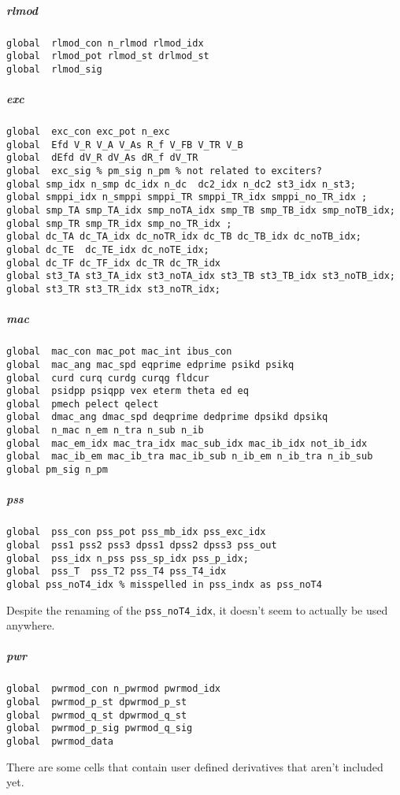 \documentclass[12pt]{article}
\begin{document}
\subparagraph{rlmod}
\begin{verbatim}
global  rlmod_con n_rlmod rlmod_idx
global  rlmod_pot rlmod_st drlmod_st
global  rlmod_sig
\end{verbatim}
\subparagraph{exc}
\begin{verbatim}
global  exc_con exc_pot n_exc
global  Efd V_R V_A V_As R_f V_FB V_TR V_B
global  dEfd dV_R dV_As dR_f dV_TR
global  exc_sig % pm_sig n_pm % not related to exciters?
global smp_idx n_smp dc_idx n_dc  dc2_idx n_dc2 st3_idx n_st3;
global smppi_idx n_smppi smppi_TR smppi_TR_idx smppi_no_TR_idx ;
global smp_TA smp_TA_idx smp_noTA_idx smp_TB smp_TB_idx smp_noTB_idx;
global smp_TR smp_TR_idx smp_no_TR_idx ;
global dc_TA dc_TA_idx dc_noTR_idx dc_TB dc_TB_idx dc_noTB_idx;
global dc_TE  dc_TE_idx dc_noTE_idx;
global dc_TF dc_TF_idx dc_TR dc_TR_idx
global st3_TA st3_TA_idx st3_noTA_idx st3_TB st3_TB_idx st3_noTB_idx;
global st3_TR st3_TR_idx st3_noTR_idx;
\end{verbatim}
\subparagraph{mac}
\begin{verbatim}
global  mac_con mac_pot mac_int ibus_con
global  mac_ang mac_spd eqprime edprime psikd psikq
global  curd curq curdg curqg fldcur
global  psidpp psiqpp vex eterm theta ed eq
global  pmech pelect qelect
global  dmac_ang dmac_spd deqprime dedprime dpsikd dpsikq
global  n_mac n_em n_tra n_sub n_ib
global  mac_em_idx mac_tra_idx mac_sub_idx mac_ib_idx not_ib_idx
global  mac_ib_em mac_ib_tra mac_ib_sub n_ib_em n_ib_tra n_ib_sub
global pm_sig n_pm 
\end{verbatim}
\subparagraph{pss}
\begin{verbatim}
global  pss_con pss_pot pss_mb_idx pss_exc_idx
global  pss1 pss2 pss3 dpss1 dpss2 dpss3 pss_out
global  pss_idx n_pss pss_sp_idx pss_p_idx;
global  pss_T  pss_T2 pss_T4 pss_T4_idx  
global pss_noT4_idx % misspelled in pss_indx as pss_noT4
\end{verbatim}
Despite the renaming of the \verb|pss_noT4_idx|, it doesn't seem to actually be used anywhere.
\subparagraph{pwr}
\begin{verbatim}
global  pwrmod_con n_pwrmod pwrmod_idx
global  pwrmod_p_st dpwrmod_p_st
global  pwrmod_q_st dpwrmod_q_st
global  pwrmod_p_sig pwrmod_q_sig
global  pwrmod_data
\end{verbatim}
There are some cells that contain user defined derivatives that aren't included yet.
\end{document}
